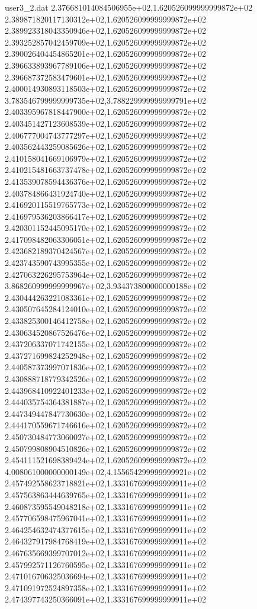 \begin{filecontents}{user3_2.dat}
2.376681014084506955e+02,1.620526099999999872e+02
2.389871820117130312e+02,1.620526099999999872e+02
2.389923318043350946e+02,1.620526099999999872e+02
2.393252857042459709e+02,1.620526099999999872e+02
2.390026404454865201e+02,1.620526099999999872e+02
2.396633893967789106e+02,1.620526099999999872e+02
2.396687372583479601e+02,1.620526099999999872e+02
2.400014930893118503e+02,1.620526099999999872e+02
3.783546799999999735e+02,3.788229999999999791e+02
2.403395967818447900e+02,1.620526099999999872e+02
2.403451427123608539e+02,1.620526099999999872e+02
2.406777004743777297e+02,1.620526099999999872e+02
2.403562443259085626e+02,1.620526099999999872e+02
2.410158041669106979e+02,1.620526099999999872e+02
2.410215481663737478e+02,1.620526099999999872e+02
2.413539078594436376e+02,1.620526099999999872e+02
2.403784866431924740e+02,1.620526099999999872e+02
2.416920115519765773e+02,1.620526099999999872e+02
2.416979536203866417e+02,1.620526099999999872e+02
2.420301152445095170e+02,1.620526099999999872e+02
2.417098482063306051e+02,1.620526099999999872e+02
2.423682189370424567e+02,1.620526099999999872e+02
2.423743590743995355e+02,1.620526099999999872e+02
2.427063226295753964e+02,1.620526099999999872e+02
3.868260999999999967e+02,3.934373800000000188e+02
2.430444263221083361e+02,1.620526099999999872e+02
2.430507645284124010e+02,1.620526099999999872e+02
2.433825300146412758e+02,1.620526099999999872e+02
2.430634520867526476e+02,1.620526099999999872e+02
2.437206337071742155e+02,1.620526099999999872e+02
2.437271699824252948e+02,1.620526099999999872e+02
2.440587373997071836e+02,1.620526099999999872e+02
2.430888718779342526e+02,1.620526099999999872e+02
2.443968410922401233e+02,1.620526099999999872e+02
2.444035754364381887e+02,1.620526099999999872e+02
2.447349447847730630e+02,1.620526099999999872e+02
2.444170559671746616e+02,1.620526099999999872e+02
2.450730484773060027e+02,1.620526099999999872e+02
2.450799808904510826e+02,1.620526099999999872e+02
2.454111521698389424e+02,1.620526099999999872e+02
4.008061000000000149e+02,4.155654299999999921e+02
2.457492558623718821e+02,1.333167699999999911e+02
2.457563863444639765e+02,1.333167699999999911e+02
2.460873595549048218e+02,1.333167699999999911e+02
2.457706598475967041e+02,1.333167699999999911e+02
2.464254632474377615e+02,1.333167699999999911e+02
2.464327917984768419e+02,1.333167699999999911e+02
2.467635669399707012e+02,1.333167699999999911e+02
2.457992571126760595e+02,1.333167699999999911e+02
2.471016706325036694e+02,1.333167699999999911e+02
2.471091972524897358e+02,1.333167699999999911e+02
2.474397743250366091e+02,1.333167699999999911e+02

\end{filecontents}
